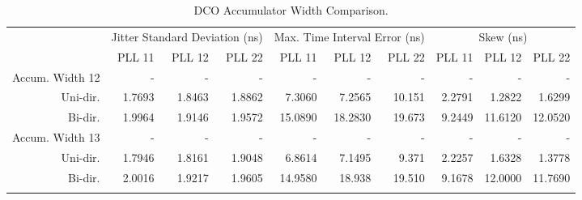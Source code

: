 \begin{table}[!ht]
    \begin{center}
        \begin{footnotesize}
            \setlength{\tabcolsep}{.9\tabcolsep}
            \begin{tabular}{ll|r|r|r|r|r|r|r|r|r|}           
                \cline{3-11}
                && \multicolumn{3}{c|}{Jitter Standard Deviation (ns)} & \multicolumn{3}{c|}{Max. Time Interval Error (ns)} & \multicolumn{3}{c|}{Skew (ns)} \T\\
                \cline{3-11} 
                &&PLL 11&PLL 12&PLL 22    &PLL 11&PLL 12&PLL 22    &PLL 11&PLL 12&PLL 22\T\\
                \hline
                \multicolumn{2}{|l|}{Accum. Width 12}&-&-&-&-&-&-&-&-&-\T\\
                \multicolumn{2}{|r|}{Uni-dir.}  &1.7693 &1.8463 &1.8862    &7.3060  &7.2565  &10.151    &2.2791 &1.2822  &1.6299  \T\\
                \multicolumn{2}{|r|}{Bi-dir.}   &1.9964 &1.9146 &1.9572    &15.0890 &18.2830 &19.673    &9.2449 &11.6120 &12.0520 \T\\
                \hline
                \multicolumn{2}{|l|}{Accum. Width 13}&-&-&-&-&-&-&-&-&-\T\\
                \multicolumn{2}{|r|}{Uni-dir.}  &1.7946 &1.8161 &1.9048    &6.8614  &7.1495 &9.371      &2.2257 &1.6328  &1.3778  \T\\
                \multicolumn{2}{|r|}{Bi-dir.}   &2.0016 &1.9217 &1.9605    &14.9580 &18.938 &19.510     &9.1678 &12.0000 &11.7690 \T\\
                \hline
                \B
            \end{tabular}
        \end{footnotesize}
        \caption{\acs{DCO} Accumulator Width Comparison.}
        \label{table:accum_width}
    \end{center}
    \vspace{-0.5cm}
\end{table}

